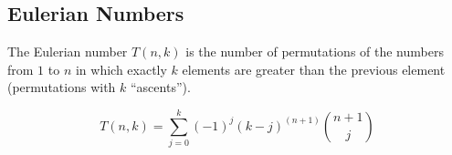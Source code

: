 \subsection{Eulerian Numbers}
The Eulerian number $T(n,k)$ is the number of permutations of the numbers from $1$ to $n$ in which exactly $k$ elements are greater than the previous element (permutations with $k$ ``ascents'').

$$ T(n,k) = \sum_{j = 0}^k (-1)^j (k-j)^{(n+1)} \binom{n+1}{j}$$
